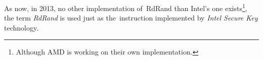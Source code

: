 As now, in 2013, no other implementation of~RdRand than Intel's one exists\footnote{Although AMD is working on their own implementation.},%
the term {\em RdRand} is used just as the~instruction implemented by {\em Intel Secure Key} technology.




